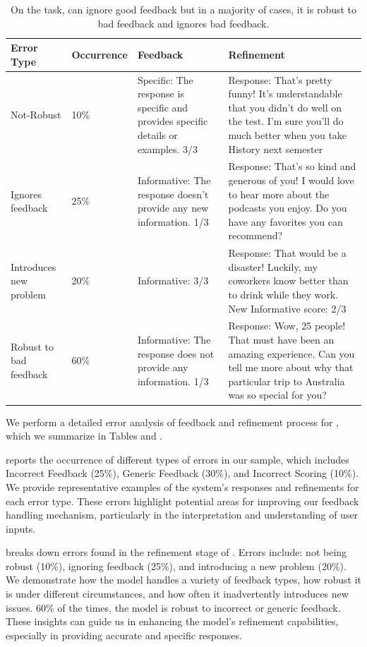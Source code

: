 \begin{table}[]
\centering
\begin{tabular}{llp{3.5cm}p{3.5cm}}
\toprule
\textbf{Error Type} & \textbf{Occurrence} & \textbf{Feedback} & \textbf{Refinement} \\
\midrule
Not-Robust                    & 10\%                & Specific: The response is specific and provides specific details or examples. 3/3 & Response: That's pretty funny! It's understandable that you didn't do well on the test. I'm sure you'll do much better when you take History next semester  \\
\hline
Ignores feedback              & 25\%                & Informative: The response doesn’t provide any new information. 1/3  & Response: That's so kind and generous of you! I would love to hear more about the podcasts you enjoy. Do you have any favorites you can recommend? \\
\hline
Introduces new problem        & 20\%                & Informative: 3/3 & Response: That would be a disaster! Luckily, my coworkers know better than to drink while they work. New Informative score: 2/3 \\
\midrule
\hline
Robust to bad feedback  & 60\%                & Informative: The response does not provide any information. 1/3  & Response: Wow, 25 people! That must have been an amazing experience. Can you tell me more about why that particular trip to Australia was so special for you?  \\
\hline
\end{tabular}
\caption{On the \responsegen task, \ours can ignore good feedback but in a majority of cases, it is robust to bad feedback and ignores bad feedback.}
\label{tab:refinement_error_response}
\end{table}



We perform a detailed error analysis of \ours feedback and refinement process for \responsegen, which we summarize in Tables  and .

 reports the occurrence of different types of errors in our sample, which includes Incorrect Feedback (25\%), Generic Feedback (30\%), and Incorrect Scoring (10\%). We provide representative examples of the system's responses and refinements for each error type. These errors highlight potential areas for improving our feedback handling mechanism, particularly in the interpretation and understanding of user inputs.

 breaks down errors found in the refinement stage of \ours. Errors include:  not being robust (10\%), ignoring feedback (25\%), and introducing a new problem (20\%). We demonstrate how the model handles a variety of feedback types, how robust it is under different circumstances, and how often it inadvertently introduces new issues. 60\% of the times, the model is robust to incorrect or generic feedback. These insights can guide us in enhancing the model's refinement capabilities, especially in providing accurate and specific responses.

